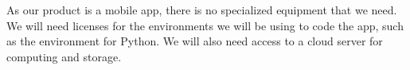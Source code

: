 As our product is a mobile app, there is no specialized equipment that we need.
We will need licenses for the environments we will be using to code the app, such as the environment for Python.
We will also need access to a cloud server for computing and storage.
